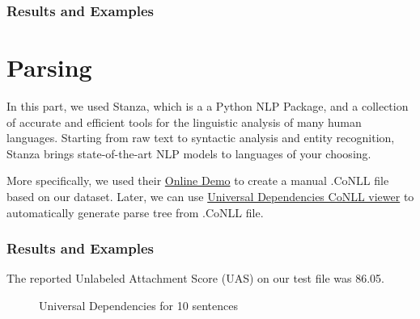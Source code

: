 \documentclass[12pt, a4paper]{article}
\begin{document}
\section*{Results and Examples}


\newpage
\part{Parsing}
In this part, we used Stanza, which is a a Python NLP Package, and a collection of accurate and efficient tools for the linguistic analysis of many human languages. Starting from raw text to syntactic analysis and entity recognition, Stanza brings state-of-the-art NLP models to languages of your choosing.

More specifically, we used their \href{http://stanza.run/}{Online Demo} to create a manual .CoNLL file based on our dataset. Later, we can use \href{https://universaldependencies.org/conllu_viewer.html}{Universal Dependencies CoNLL viewer} to automatically generate parse tree from .CoNLL file.

\section*{Results and Examples}

The reported Unlabeled Attachment Score (UAS) on our test file was 86.05.

\begin{figure}[H]
	\caption{Universal Dependencies for 10 sentences}
	\label{parsing_examples}
\end{figure}
\end{document}

